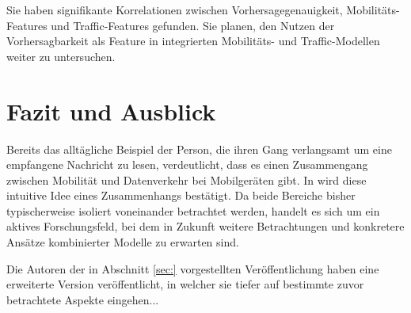 \documentclass[12pt, a4paper]{article}
\begin{document}
Sie haben signifikante Korrelationen zwischen Vorhersagegenauigkeit, Mobilitäts-Features
und Traffic-Features gefunden. Sie planen, den Nutzen der Vorhersagbarkeit als Feature 
in integrierten Mobilitäts- und Traffic-Modellen weiter zu untersuchen.

\section{Fazit und Ausblick}
\label{sec:conclusion}

Bereits das alltägliche Beispiel der Person, die ihren Gang verlangsamt um eine empfangene Nachricht zu lesen,
verdeutlicht, dass es einen Zusammengang zwischen Mobilität und Datenverkehr bei Mobilgeräten gibt.
In \cite{Alipour2018} wird diese intuitive Idee eines Zusammenhangs bestätigt. Da beide Bereiche
bisher typischerweise isoliert voneinander betrachtet werden, handelt es sich um ein aktives Forschungsfeld,
bei dem in Zukunft weitere Betrachtungen und konkretere Ansätze kombinierter Modelle zu erwarten sind.

Die Autoren der in Abschnitt \ref{sec:} vorgestellten Veröffentlichung haben eine erweiterte Version veröffentlicht,
in welcher sie tiefer auf bestimmte zuvor betrachtete Aspekte eingehen...

\vfill
\pagebreak


%

\end{document}
